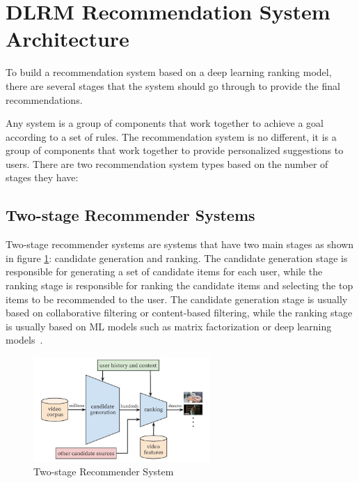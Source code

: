 

\section{DLRM Recommendation System Architecture}

To build a recommendation system based on a deep learning ranking model, there are several stages that the system should go through to provide the final recommendations.

Any system is a group of components that work together to achieve a goal according to a set of rules. The recommendation system is no different, it is a group of components that work together to provide personalized suggestions to users. There are two recommendation system types based on the number of stages they have:
\subsection{Two-stage Recommender Systems}
Two-stage recommender systems are systems that have two main stages as shown in figure \ref{fig:TwoStageRecSys}: candidate generation and ranking. The candidate generation stage is responsible for generating a set of candidate items for each user, while the ranking stage is responsible for ranking the candidate items and selecting the top items to be recommended to the user. The candidate generation stage is usually based on collaborative filtering or content-based filtering, while the ranking stage is usually based on ML models such as matrix factorization or deep learning models~\cite{MultiStageRecSys}.
\begin{figure}[H]
    \centering
    \includegraphics[width=0.6\textwidth]{assets/Two_stage_rec_sys.jpg}
    \caption[Two-stage Recommender System]{Two-stage Recommender System\cite{MultiStageRecSys}}
    \label{fig:TwoStageRecSys}
\end{figure}
